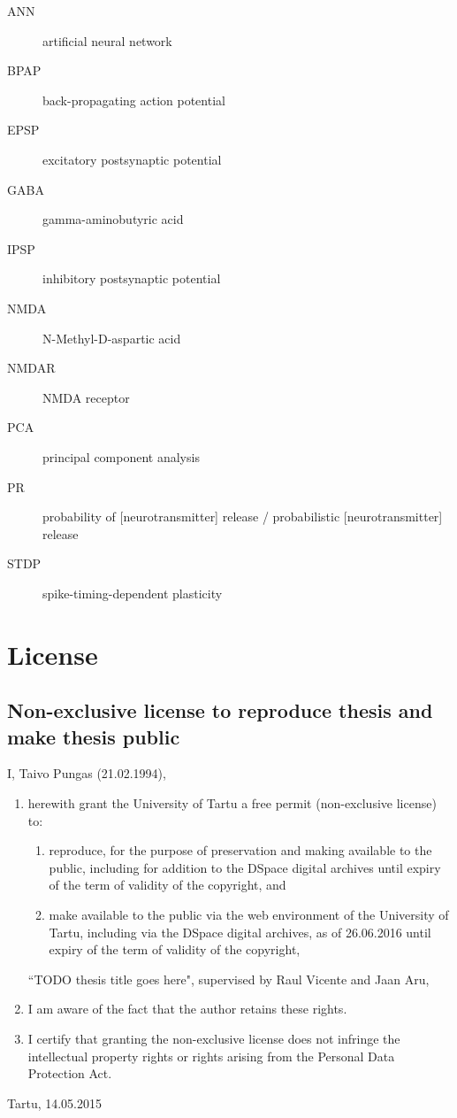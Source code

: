 \documentclass[a4paper,12pt]{report}
\theoremstyle{definition}
\begin{document}
\begin{description}
  \item[ANN] artificial neural network
  \item[BPAP] back-propagating action potential
  \item[EPSP] excitatory postsynaptic potential
  \item[GABA] gamma-aminobutyric acid
  \item[IPSP] inhibitory postsynaptic potential
  \item[NMDA] N-Methyl-D-aspartic acid
  \item[NMDAR] NMDA receptor
  \item[PCA] principal component analysis
  \item[PR] probability of [neurotransmitter] release / probabilistic [neurotransmitter] release
  \item[STDP] spike-timing-dependent plasticity
\end{description}





\chapter*{License}


%
%
\section*{Non-exclusive license to reproduce thesis and make thesis public}
I, Taivo Pungas (21.02.1994), 
\begin{enumerate}
	\item herewith grant the University of Tartu a free permit (non-exclusive license) to:
	\begin{enumerate}[label*=\arabic*.]
		\renewcommand{\theenumi}{\arabic{enumi}}
		\item reproduce, for the purpose of preservation and making available to the public, including for addition to the DSpace digital archives until expiry of the term of validity of the copyright, and
		\item make available to the public via the web environment of the University of Tartu, including via the DSpace digital archives, as of 26.06.2016 until expiry of the term of validity of the copyright,
	\end{enumerate}
	``TODO thesis title goes here", supervised by Raul Vicente and Jaan Aru,
	
	\item I am aware of the fact that the author retains these rights.

	\item I certify that granting the non-exclusive license does not infringe the intellectual property rights or rights arising from the Personal Data Protection Act. 
\end{enumerate}

Tartu, 14.05.2015

\thispagestyle{empty}
\newpage
\end{document}
